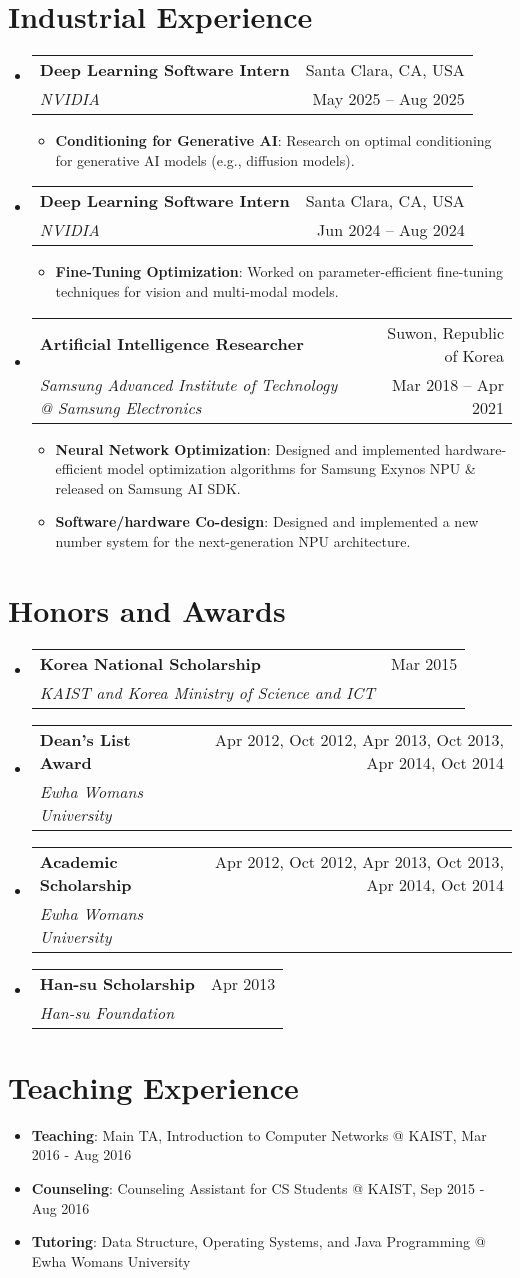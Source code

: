 \documentclass[letterpaper,oneside,11pt]{article}
\makeatletter
\newcommand{\resumeItem}[2]{
  \item\small{
    \textbf{#1}{: #2 \vspace{-2pt}}
  }
}
\newcommand{\resumeSubheading}[4]{
  \vspace{-2pt}\item
    \begin{tabularx}{0.97\textwidth}[t]{X@{\hspace{-5pt}}r}
      \textbf{#1} & #2 \\
      \textit{\small#3} & \small #4 \\
    \end{tabularx}\vspace{-6pt}
}
\newcommand{\awardsSubheading}[4]{
  \resumeSubheading{#1}{#2}{#3}{#4}\vspace{0pt}
}
\newcommand{\resumeSubHeadingListStart}{\begin{itemize}[leftmargin=*]}
\newcommand{\resumeSubHeadingListEnd}{\end{itemize}}
\newcommand{\resumeItemListStart}{\begin{itemize}}
\newcommand{\resumeItemListEnd}{\end{itemize}\vspace{-5pt}}
\makeatother
\begin{document}
\section{Industrial Experience}
\resumeSubHeadingListStart
  \resumeSubheading
  {Deep Learning Software Intern}{Santa Clara, CA, USA}
  {NVIDIA}{May 2025 -- Aug 2025}
    \resumeItemListStart
    \resumeItem{Conditioning for Generative AI}{Research on optimal conditioning for generative AI models (e.g., diffusion models).}    
    \resumeItemListEnd
   \resumeSubheading
    {Deep Learning Software Intern}{Santa Clara, CA, USA}
    {NVIDIA}{Jun 2024 -- Aug 2024}
    \resumeItemListStart
      \resumeItem{Fine-Tuning Optimization}{Worked on parameter-efficient fine-tuning techniques for vision and multi-modal models.}
    \resumeItemListEnd
    \resumeSubheading
      {Artificial Intelligence Researcher}{Suwon, Republic of Korea}
      {Samsung Advanced Institute of Technology @ Samsung Electronics}{Mar 2018 -- Apr 2021}
      \resumeItemListStart
        \resumeItem{Neural Network Optimization}{Designed and implemented hardware-efficient model optimization algorithms for Samsung Exynos NPU \& released on Samsung AI SDK.}
        \resumeItem{Software/hardware Co-design}{Designed and implemented a new number system for the next-generation NPU architecture.}
      \resumeItemListEnd
  \resumeSubHeadingListEnd

\section{Honors and Awards}
  \resumeSubHeadingListStart
    \awardsSubheading{Korea National Scholarship}{Mar 2015}
    {KAIST and Korea Ministry of Science and ICT}{}
    \awardsSubheading{Dean's List Award}{Apr 2012, Oct 2012, Apr 2013, Oct 2013, Apr 2014, Oct 2014}
    {Ewha Womans University}{}
    \awardsSubheading{Academic Scholarship}{Apr 2012, Oct 2012, Apr 2013, Oct 2013, Apr 2014, Oct 2014}
    {Ewha Womans University}{}
    \awardsSubheading{Han-su Scholarship}{Apr 2013}
    {Han-su Foundation}{}
  \resumeSubHeadingListEnd

%

\section{Teaching Experience}
\resumeSubHeadingListStart
  \resumeItem{Teaching}{Main TA, Introduction to Computer Networks @ KAIST, Mar 2016 - Aug 2016}
  \resumeItem{Counseling}{Counseling Assistant for CS Students @ KAIST, Sep 2015 - Aug 2016}
  \resumeItem{Tutoring}{Data Structure, Operating Systems, and Java Programming @ Ewha Womans University}
\resumeSubHeadingListEnd
\end{document}
